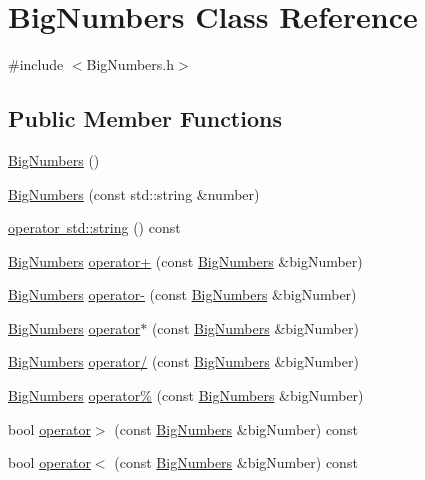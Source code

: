 \hypertarget{class_big_numbers}{}\section{Big\+Numbers Class Reference}
\label{class_big_numbers}


{\ttfamily \#include $<$Big\+Numbers.\+h$>$}

\subsection*{Public Member Functions}
\begin{DoxyCompactItemize}
\item 
\mbox{\hyperlink{class_big_numbers_af3dd82883f10f3473ac83280f26b0ad8}{Big\+Numbers}} ()
\item 
\mbox{\hyperlink{class_big_numbers_a7aca99911efb6981ac70f1514e8f2a5e}{Big\+Numbers}} (const std\+::string \&number)
\item 
\mbox{\hyperlink{class_big_numbers_af879df797b67fcbe442746d0532529ab}{operator std\+::string}} () const
\item 
\mbox{\hyperlink{class_big_numbers}{Big\+Numbers}} \mbox{\hyperlink{class_big_numbers_a680111de22672f72e0e102b42352d3bc}{operator+}} (const \mbox{\hyperlink{class_big_numbers}{Big\+Numbers}} \&big\+Number)
\item 
\mbox{\hyperlink{class_big_numbers}{Big\+Numbers}} \mbox{\hyperlink{class_big_numbers_ad4b60c48e9da0bd5f9845d7ce73bdc90}{operator-\/}} (const \mbox{\hyperlink{class_big_numbers}{Big\+Numbers}} \&big\+Number)
\item 
\mbox{\hyperlink{class_big_numbers}{Big\+Numbers}} \mbox{\hyperlink{class_big_numbers_a831e8203da581ad999f9f45940a92776}{operator$\ast$}} (const \mbox{\hyperlink{class_big_numbers}{Big\+Numbers}} \&big\+Number)
\item 
\mbox{\hyperlink{class_big_numbers}{Big\+Numbers}} \mbox{\hyperlink{class_big_numbers_af7ad124c6e92a0ae647f3aa3cd85f11a}{operator/}} (const \mbox{\hyperlink{class_big_numbers}{Big\+Numbers}} \&big\+Number)
\item 
\mbox{\hyperlink{class_big_numbers}{Big\+Numbers}} \mbox{\hyperlink{class_big_numbers_a15bc2fa1946a85e8cd745a26e460d51e}{operator\%}} (const \mbox{\hyperlink{class_big_numbers}{Big\+Numbers}} \&big\+Number)
\item 
bool \mbox{\hyperlink{class_big_numbers_a5fed3d1c9f239f4c57348953077eab77}{operator$>$}} (const \mbox{\hyperlink{class_big_numbers}{Big\+Numbers}} \&big\+Number) const
\item 
bool \mbox{\hyperlink{class_big_numbers_aed0d88ccd1ba6d7b1548c14a95de1b1a}{operator$<$}} (const \mbox{\hyperlink{class_big_numbers}{Big\+Numbers}} \&big\+Number) const
\end{DoxyCompactItemize}
